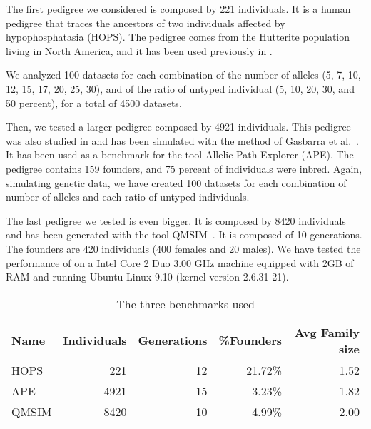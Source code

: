 The first pedigree we considered is composed by 221 individuals. It is a human
pedigree that traces the ancestors of two individuals affected by
hypophosphatasia (HOPS). The pedigree comes from the Hutterite population living
in North America, and it has been used previously in \cite{luolin,Pirinen2006}.

We analyzed 100 datasets for each combination of the number of alleles (5, 7, 10,
12, 15, 17, 20, 25, 30), and of the ratio of untyped individual (5, 10, 20, 30, and 50
percent), for a total of 4500 datasets. 


Then, we tested a larger pedigree composed by 4921 individuals. This pedigree
was also studied in \cite{Pirinen2006} and has been simulated with the method of
Gasbarra et al.~\cite{Gasbarra200575}. It has been used as a benchmark for the
tool Allelic Path Explorer (APE). The pedigree contains 159 founders, and
75 percent of individuals were inbred. Again, simulating genetic data, we have
created 100 datasets for each combination of number of alleles and each
ratio of untyped individuals.

The last pedigree we tested is even bigger. It is composed by 8420 individuals
and has been generated with the tool QMSIM~\cite{qmsim}. It is composed of 10
generations. The founders are 420 individuals (400 females and 20 males).  We
have tested the performance of  on a Intel Core 2 Duo 3.00 GHz
machine equipped with 2GB of RAM and running Ubuntu Linux 9.10 (kernel version
2.6.31-21).


\begin{table}
  \centering
  \begin{tabular}{lrrrr}
    \textbf{Name}&\textbf{Individuals}&\textbf{Generations}&\textbf{\%Founders}&\textbf{Avg
    Family size}\\\hline
    HOPS  & 221  & 12 & 21.72\% & 1.52 \\
    APE   & 4921 & 15 & 3.23\%  & 1.82 \\ 
    QMSIM & 8420 & 10 & 4.99\%  & 2.00 \\\hline
  \end{tabular}
  \caption{The three benchmarks used }
  \label{tab:benchmarkdata}
\end{table}


